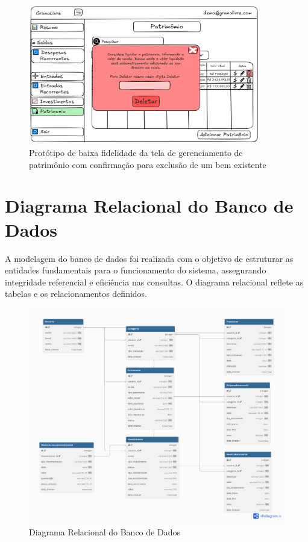 \begin{figure}[H]
    \centering
    \includegraphics[width=0.9\textwidth]{imgs/09-patrimonio6.png}
    \caption{Protótipo de baixa fidelidade da tela de gerenciamento de patrimônio com confirmação para exclusão de um bem existente}
    \label{fig:prot_patrimonio6}
\end{figure}


\section{Diagrama Relacional do Banco de Dados}
A modelagem do banco de dados foi realizada com o objetivo de estruturar as entidades fundamentais para o funcionamento do sistema, assegurando integridade referencial e eficiência nas consultas. O diagrama relacional reflete as tabelas e os relacionamentos definidos.

\begin{figure}[H]
    \centering
    \includegraphics[width=1.1\textwidth]{imgs/diagramabd.png}
    \caption{Diagrama Relacional do Banco de Dados}
    \label{fig:der}
\end{figure}
